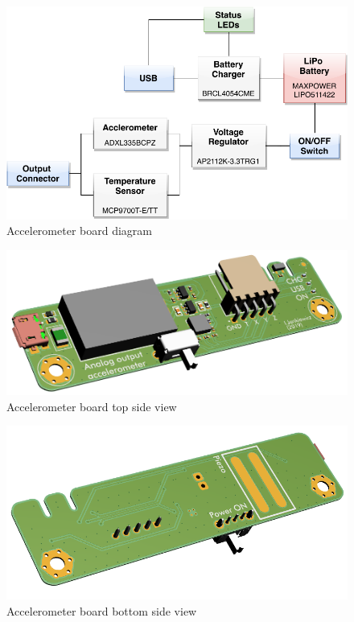 \documentclass[12pt,a4paper]{article}
\begin{document}
\begin{figure}[ht!]
\includegraphics[scale=1]{accel.pdf}
\caption{Accelerometer board diagram}
\label{fig:accel_diagram}
\end{figure}

\begin{figure}[ht!]
\includegraphics[scale=0.6]{accelerometer1.png}
\caption{Accelerometer board top side view}
\label{fig:accel1}
\end{figure}

\begin{figure}[ht!]
\includegraphics[scale=0.7]{accelerometer2.png}
\caption{Accelerometer board bottom side view}
\label{fig:accel2}
\end{figure}
\par 
\end{document}
